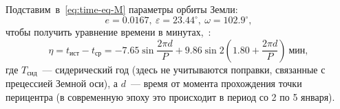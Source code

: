 Подставим~в~\eqref{eq:time-eq-M} параметры орбиты Земли:
\begin{equation*}
    e = 0.0167,~\varepsilon = 23.44^\circ,~\omega = 102.9^\circ,
\end{equation*}
чтобы получить уравнение времени в минутах,~:
\begin{equation}
    \eta = t_\text{ист} - t_\text{ср} =  -7.65 \sin \frac{2\pi d}{P} + 9.86 \sin 2 \left( 1.80 + \frac{2\pi d}{P} \right)~\text{мин},
\end{equation}
где $T_\text{сид}$~--- сидерический год (здесь не учитываются поправки, связанные с прецессией Земной оси), а $d$~--- время от момента прохождения точки перицентра (в современную эпоху это происходит в период со 2 по 5 января).
